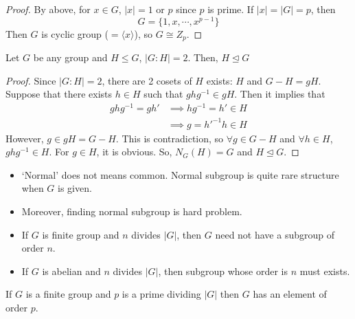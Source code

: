 \documentclass[12pt, a4paper, openany, twoside]{book}
\theoremstyle{definition}
\theoremstyle{remark}
\theoremstyle{plain}
\numberwithin{equation}{section}
\begin{document}
\begin{proof}
    
By above, for $x \in G$, $|x| = 1$ or $p$ since $p$ is prime. If $|x| = |G| = p$, then 
\[G = \{1, x, \cdots, x^{p-1}\}\]
Then $G$ is cyclic group ($=\langle x \rangle$), so $G \cong Z_p$. 

\end{proof}

\begin{tcolorbox}[colback=yellow!10!white,colframe=gray!75!black,title=Example,breakable]

Let $G$ be any group and $H \leq G$, $|G:H| = 2$. Then, $H \trianglelefteq G$

\end{tcolorbox}

\begin{proof}
    
Since $|G:H| = 2$, there are 2 cosets of $H$ exists: $H$ and $G - H = gH$. 
Suppose that there exists $h \in H$ such that $ghg^{-1} \in gH$. Then it implies that 
\begin{align*}
    ghg^{-1} = gh' & \implies hg^{-1} = h' \in H \\
    & \implies g = h'^{-1}h \in H
\end{align*}
However, $g \in gH = G - H$. This is contradiction, so $\forall g \in G - H$ and $\forall h \in H$, $ghg^{-1} \in H$. 
For $g \in H$, it is obvious. So, $N_G(H) = G$ and $H \trianglelefteq G$. 

\end{proof}

\begin{tcolorbox}[colback=yellow!10!white,colframe=red!75!black,title=Remarks]

\begin{itemize}
    \item \lq Normal' does not means common. Normal subgroup is quite rare structure when $G$ is given. 
    \item Moreover, finding normal subgroup is hard problem. 
    \item If $G$ is finite group and $n$ divides $|G|$, then $G$ need not have a subgroup of order $n$.
    \item If $G$ is abelian and $n$ divides $|G|$, then subgroup whose order is $n$ must exists. 
\end{itemize}

\end{tcolorbox}

\begin{tcolorbox}[colback=yellow!10!white,colframe=blue!75!black,title=Cauchy's Theorem]

If $G$ is a finite group and $p$ is a prime dividing $|G|$ then $G$ has an element of order $p$. 

\end{tcolorbox}
\end{document}
